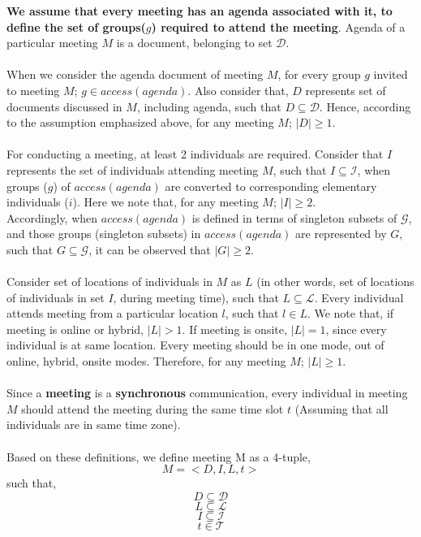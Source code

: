 \noindent
\textbf{We assume that every meeting has an agenda associated with it, to define the set of groups($g$) required to attend the meeting}. Agenda of a particular meeting $M$ is a document, belonging to set $\mathcal{D}$.\\ \\
When we consider the agenda document of meeting $M$, for every group $g$ invited to meeting $M$; $g \in access(agenda)$. Also consider that, $D$ represents set of documents discussed in $M$, including agenda, such that $D \subseteq \mathcal{D}$. Hence, according to the assumption emphasized above, for any meeting $M$; $|D| \geq 1$.\\ \\ 
For conducting a meeting, at least 2 individuals are required. Consider that $I$ represents the set of individuals attending meeting $M$, such that $I \subseteq \mathcal{I}$, when groups ($g$) of $access(agenda)$ are converted to corresponding elementary individuals ($i$). Here we note that, for any meeting $M$; $|I| \geq 2$.\\
Accordingly, when $access(agenda)$ is defined in terms of singleton subsets of $\mathcal{G}$, and those groups (singleton subsets) in $access(agenda)$ are represented by $G$, such that $G \subseteq \mathcal{G}$, it can be observed that $|G| \geq 2$. \\ \\  
Consider set of locations of individuals in $M$ as $L$ (in other words, set of locations of individuals in set $I$, during meeting time), such that $L \subseteq \mathcal{L}$. Every individual attends meeting from a particular location $l$, such that $l \in L$. We note that, if meeting is online or hybrid, $|L| > 1$. If meeting is onsite, $|L| = 1$, since every individual is at same location. Every meeting should be in one mode, out of online, hybrid, onsite modes. Therefore, for any meeting $M$; $|L| \geq 1$. \\ \\
Since a \textbf{meeting} is a \textbf{synchronous} communication, every individual in meeting $M$ should attend the meeting during the same time slot $t$ (Assuming that all individuals are in same time zone).  \\ \\
Based on these definitions, we define meeting M as a 4-tuple,
    \[ M = < D, I, L, t > \]
such that,
    \[ D \subseteq \mathcal{D} \]
    \[ L \subseteq \mathcal{L} \]
    \[ I \subseteq \mathcal{I} \]
    \[ t \in \mathcal{T} \]



